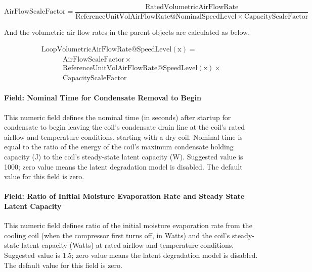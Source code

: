 \begin{equation}
\mathrm{AirFlowScaleFactor} = \frac{\mathrm{RatedVolumetricAirFlowRate}}{\mathrm{ReferenceUnitVolAirFlowRate} @ \mathrm{NominalSpeedLevel} \times \mathrm{CapacityScaleFactor}}
\end{equation}

And the volumetric air flow rates in the parent objects are calculated as below,

\begin{equation}
  \begin{array}{l}
    \mathrm{LoopVolumetricAirFlowRate} @ \mathrm{SpeedLevel} \left( \mathrm{x} \right) = \\
    \quad \quad \quad \mathrm{AirFlowScaleFactor} \times \\
    \quad \quad \quad \mathrm{ReferenceUnitVolAirFlowRate} @ \mathrm{SpeedLevel}(\mathrm{x}) \times \\
    \quad \quad \quad \mathrm{CapacityScaleFactor}
  \end{array}
\end{equation}

\paragraph{Field: Nominal Time for Condensate Removal to Begin}\label{field-nominal-time-for-condensate-removal-to-begin-1}

This numeric field defines the nominal time (in seconds) after startup for condensate to begin leaving the coil's condensate drain line at the coil's rated airflow and temperature conditions, starting with a dry coil. Nominal time is equal to the ratio of the energy of the coil's maximum condensate holding capacity (J) to the coil's steady-state latent capacity (W). Suggested value is 1000; zero value means the latent degradation model is disabled. The default value for this field is zero.

\paragraph{Field: Ratio of Initial Moisture Evaporation Rate and Steady State Latent Capacity}\label{field-ratio-of-initial-moisture-evaporation-rate-and-steady-state-latent-capacity-1}

This numeric field defines ratio of the initial moisture evaporation rate from the cooling coil (when the compressor first turns off, in Watts) and the coil's steady-state latent capacity (Watts) at rated airflow and temperature conditions. Suggested value is 1.5; zero value means the latent degradation model is disabled. The default value for this field is zero.

